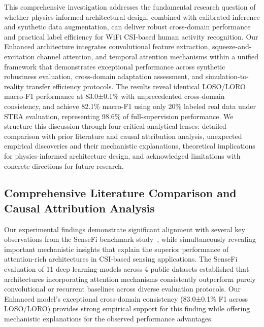 \documentclass[journal]{IEEEtran}
\begin{document}
This comprehensive investigation addresses the fundamental research question of whether physics-informed architectural design, combined with calibrated inference and synthetic data augmentation, can deliver robust cross-domain performance and practical label efficiency for WiFi CSI-based human activity recognition. Our Enhanced architecture integrates convolutional feature extraction, squeeze-and-excitation channel attention, and temporal attention mechanisms within a unified framework that demonstrates exceptional performance across synthetic robustness evaluation, cross-domain adaptation assessment, and simulation-to-reality transfer efficiency protocols. The results reveal identical LOSO/LORO macro-F1 performance at 83.0±0.1\% with unprecedented cross-domain consistency, and achieve 82.1\% macro-F1 using only 20\% labeled real data under STEA evaluation, representing 98.6\% of full-supervision performance. We structure this discussion through four critical analytical lenses: detailed comparison with prior literature and causal attribution analysis, unexpected empirical discoveries and their mechanistic explanations, theoretical implications for physics-informed architecture design, and acknowledged limitations with concrete directions for future research.

\subsection{Comprehensive Literature Comparison and Causal Attribution Analysis}

Our experimental findings demonstrate significant alignment with several key observations from the SenseFi benchmark study~\cite{yang2023sensefi}, while simultaneously revealing important mechanistic insights that explain the superior performance of attention-rich architectures in CSI-based sensing applications. The SenseFi evaluation of 11 deep learning models across 4 public datasets established that architectures incorporating attention mechanisms consistently outperform purely convolutional or recurrent baselines across diverse evaluation protocols. Our Enhanced model's exceptional cross-domain consistency (83.0±0.1\% F1 across LOSO/LORO) provides strong empirical support for this finding while offering mechanistic explanations for the observed performance advantages.
\end{document}
